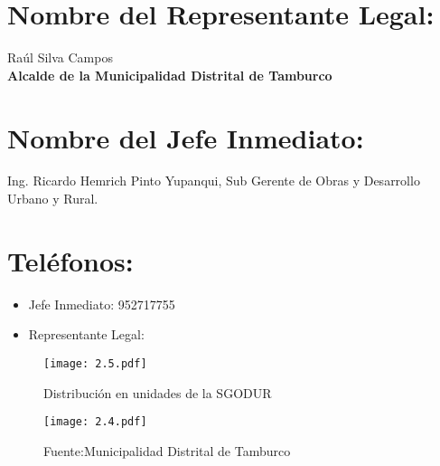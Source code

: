 \section{Nombre del Representante Legal:}
\noindent Raúl Silva Campos\\
\textbf{Alcalde de la Municipalidad Distrital de Tamburco}

\section{Nombre del Jefe Inmediato:}
\noindent Ing. Ricardo Hemrich Pinto Yupanqui, Sub Gerente de Obras y Desarrollo Urbano y Rural.\\

\section{Teléfonos:}
\begin{itemize}
	\item Jefe Inmediato: 952717755
	\item Representante Legal:
\end{itemize}

\vspace{3mm}
\begin{figure}[h!]
	\captionsetup{width=0.8\textwidth}
	\centering
	\texttt{[image: 2.5.pdf]}
	\caption{Distribución en unidades de la SGODUR}
	\label{fig:2.5}
\end{figure}
\newpage
\begin{figure}[H]
	\centering
	\texttt{[image: 2.4.pdf]}
	\caption[Organigrama de la Municipalidad Distrital de Tamburco]{Fuente:Municipalidad Distrital de Tamburco}
	\label{fig:organigrama-tamburco}
\end{figure}